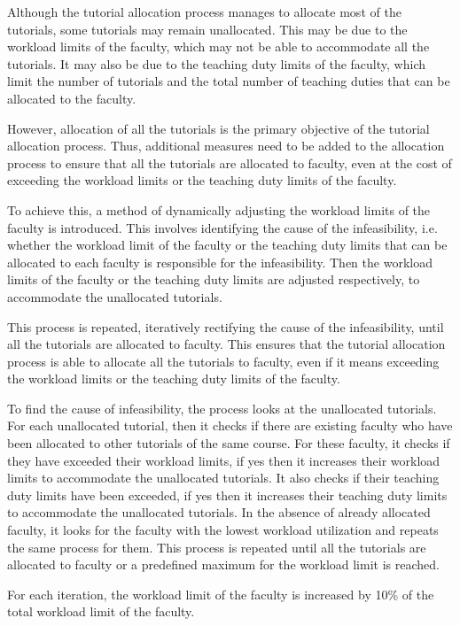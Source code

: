 Although the tutorial allocation process manages to allocate most of the tutorials, some tutorials may remain unallocated. This may be due to the workload limits of the faculty, which may not be able to accommodate all the tutorials. It may also be due to the teaching duty limits of the faculty, which limit the number of tutorials and the total number of teaching duties that can be allocated to the faculty.

However, allocation of all the tutorials is the primary objective of the tutorial allocation process. Thus, additional measures need to be added to the allocation process to ensure that all the tutorials are allocated to faculty, even at the cost of exceeding the workload limits or the teaching duty limits of the faculty.

To achieve this, a method of dynamically adjusting the workload limits of the faculty is introduced. This involves identifying the cause of the infeasibility, i.e. whether the workload limit of the faculty or the teaching duty limits that can be allocated to each faculty is responsible for the infeasibility. Then the workload limits of the faculty or the teaching duty limits are adjusted respectively, to accommodate the unallocated tutorials.

This process is repeated, iteratively rectifying the cause of the infeasibility, until all the tutorials are allocated to faculty. This ensures that the tutorial allocation process is able to allocate all the tutorials to faculty, even if it means exceeding the workload limits or the teaching duty limits of the faculty.

To find the cause of infeasibility, the process looks at the unallocated tutorials. For each unallocated tutorial, then it checks if there are existing faculty who have been allocated to other tutorials of the same course. For these faculty, it checks if they have exceeded their workload limits, if yes then it increases their workload limits to accommodate the unallocated tutorials. It also checks if their teaching duty limits have been exceeded, if yes then it increases their teaching duty limits to accommodate the unallocated tutorials. In the absence of already allocated faculty, it looks for the faculty with the lowest workload utilization and repeats the same process for them. This process is repeated until all the tutorials are allocated to faculty or a predefined maximum for the workload limit is reached.

For each iteration, the workload limit of the faculty is increased by 10\% of the total workload limit of the faculty.

